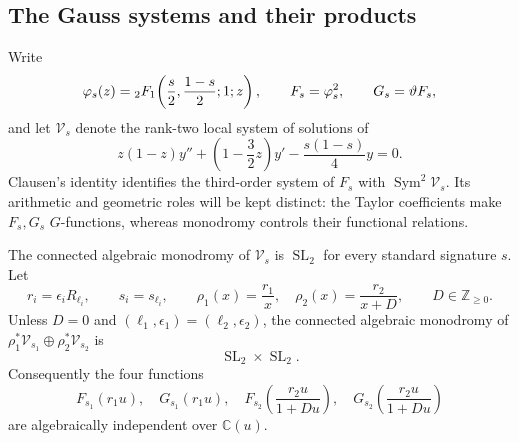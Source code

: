 \subsection{The Gauss systems and their products}

Write
\[
 \varphi_s(z)={}_2F_1\!\left(\frac{s}{2},\frac{1-s}{2};1;z\right),
 \qquad F_s=\varphi_s^2,\qquad G_s=\vartheta F_s,
\]
and let $\mathcal V_s$ denote the rank-two local system of solutions of
\begin{equation}\label{eq:C-gauss-operator}
 z(1-z)y''+\left(1-\frac32z\right)y'
                      -\frac{s(1-s)}4y=0.
\end{equation}
Clausen's identity identifies the third-order system of $F_s$ with
$\operatorname{Sym}^2\mathcal V_s$.  Its arithmetic and geometric
roles will be kept distinct: the Taylor coefficients make $F_s,G_s$
$G$-functions, whereas monodromy controls their functional relations.

\begin{lemma}\label{rev:lem:product-monodromy}
The connected algebraic monodromy of $\mathcal V_s$ is
$\operatorname{SL}_2$ for every standard signature $s$.
Let
\[
 r_i=\epsilon_iR_{\ell_i},\qquad s_i=s_{\ell_i},\qquad
 \rho_1(x)=\frac{r_1}{x},\quad
 \rho_2(x)=\frac{r_2}{x+D},\qquad D\in\mathbb Z_{\geq0}.
\]
Unless $D=0$ and $(\ell_1,\epsilon_1)=(\ell_2,\epsilon_2)$,
the connected algebraic monodromy of
$\rho_1^*\mathcal V_{s_1}\oplus\rho_2^*\mathcal V_{s_2}$ is
\[
                 \operatorname{SL}_2\times\operatorname{SL}_2.
\]
Consequently the four functions
\begin{equation}\label{rev:eq:independent-four}
 F_{s_1}(r_1u),\quad G_{s_1}(r_1u),\quad
 F_{s_2}\!\left(\frac{r_2u}{1+Du}\right),\quad
 G_{s_2}\!\left(\frac{r_2u}{1+Du}\right)
\end{equation}
are algebraically independent over $\mathbb C(u)$.
\end{lemma}

